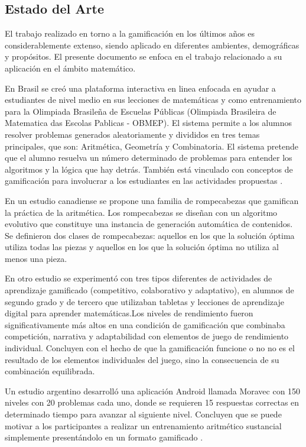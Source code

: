 \documentclass{article}
\begin{document}
\subsection{Estado del Arte}
El trabajo realizado en torno a la gamificación en los últimos años es considerablemente extenso, siendo aplicado en diferentes ambientes, demográficas y propósitos. El presente documento se enfoca en el trabajo relacionado a su aplicación en el ámbito matemático.

En Brasil se creó una plataforma  interactiva en linea enfocada en ayudar a estudiantes de nivel medio en sus lecciones de matemáticas y como entrenamiento para la Olimpiada Brasileña de Escuelas Públicas (Olimpiada Brasileira de Matematica das Escolas Pablicas - OBMEP). El sistema permite a los alumnos resolver problemas generados aleatoriamente y divididos en tres temas principales, que son: Aritmética, Geometría y Combinatoria. El sistema pretende que el alumno resuelva un número determinado de problemas para entender los algoritmos y la lógica que hay detrás. También está vinculado con conceptos de gamificación para involucrar a los estudiantes en las actividades propuestas \cite{toda2014project}.

En un estudio canadiense se propone una familia de rompecabezas que gamifican la práctica de la aritmética. Los rompecabezas se diseñan con un algoritmo evolutivo que constituye una instancia de generación automática de contenidos. Se definieron dos clases de rompecabezas: aquellos en los que la solución óptima utiliza todas las piezas y aquellos en los que la solución óptima no utiliza al menos una pieza\cite{foxcroft2020polyomino}.

En otro estudio \cite{jaguvst2018examining} se experimentó con tres tipos diferentes de actividades de aprendizaje gamificado (competitivo, colaborativo y adaptativo), en alumnos de segundo grado y de tercero que utilizaban tabletas y lecciones de aprendizaje digital para aprender matemáticas.Los niveles de rendimiento fueron significativamente más altos en una condición de gamificación que combinaba competición, narrativa y adaptabilidad con elementos de juego de rendimiento individual. Concluyen con el hecho de que la gamificación funcione o no no es el resultado de los elementos individuales del juego, sino la consecuencia de su combinación equilibrada.
 
Un estudio argentino \cite{zimmerman2016arithmetic} desarrolló una aplicación Android llamada Moravec con 150 niveles con 20 problemas cada uno, donde se requieren 15 respuestas correctas en determinado tiempo para avanzar al siguiente nivel. Concluyen que se puede motivar a los participantes a realizar un entrenamiento aritmético sustancial simplemente presentándolo en un formato gamificado .
\end{document}
